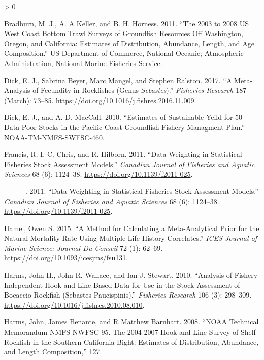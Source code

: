 \documentclass[11pt,
  english,
  a4paper,
]{article}
\newlength{\cslhangindent}
\newenvironment{CSLReferences}[2] %
 {%
  \setlength{\parindent}{0pt}
  \ifodd #1 \everypar{\setlength{\hangindent}{\cslhangindent}}\ignorespaces\fi
  \ifnum #2 > 0
  \setlength{\parskip}{#2\baselineskip}
  \fi
 }%
 {}
\begin{document}
\hypertarget{refs}{}
\begin{CSLReferences}{1}{0}
\leavevmode\hypertarget{ref-bradburn_2003_2011}{}%
Bradburn, M. J., A. A Keller, and B. H. Horness. 2011. {``The 2003 to 2008 {US} {West} {Coast} Bottom Trawl Surveys of Groundfish Resources Off {Washington}, {Oregon}, and {California}: Estimates of Distribution, Abundance, Length, and Age Composition.''} US Department of Commerce, National Oceanic; Atmospheric Administration, National Marine Fisheries Service.

\leavevmode\hypertarget{ref-dick_meta-analysis_2017}{}%
Dick, E. J., Sabrina Beyer, Marc Mangel, and Stephen Ralston. 2017. {``A Meta-Analysis of Fecundity in Rockfishes (Genus \emph{Sebastes}).''} \emph{Fisheries Research} 187 (March): 73--85. \url{https://doi.org/10.1016/j.fishres.2016.11.009}.

\leavevmode\hypertarget{ref-dick_estimates_2010}{}%
Dick, E. J., and A. D. MacCall. 2010. {``Estimates of Sustainable Yeild for 50 Data-Poor Stocks in the {Pacific} {Coast} Groundfish Fishery Managment Plan.''} NOAA-TM-NMFS-SWFSC-460.

\leavevmode\hypertarget{ref-francis_data_2011}{}%
Francis, R. I. C. Chris, and R. Hilborn. 2011. {``Data Weighting in Statistical Fisheries Stock Assessment Models.''} \emph{Canadian Journal of Fisheries and Aquatic Sciences} 68 (6): 1124--38. \url{https://doi.org/10.1139/f2011-025}.

\leavevmode\hypertarget{ref-francis_data_2011}{}%
---------. 2011. {``Data Weighting in Statistical Fisheries Stock Assessment Models.''} \emph{Canadian Journal of Fisheries and Aquatic Sciences} 68 (6): 1124--38. \url{https://doi.org/10.1139/f2011-025}.

\leavevmode\hypertarget{ref-hamel_method_2015}{}%
Hamel, Owen S. 2015. {``A Method for Calculating a Meta-Analytical Prior for the Natural Mortality Rate Using Multiple Life History Correlates.''} \emph{ICES Journal of Marine Science: Journal Du Conseil} 72 (1): 62--69. \url{https://doi.org/10.1093/icesjms/fsu131}.

\leavevmode\hypertarget{ref-harms_analysis_2010}{}%
Harms, John H., John R. Wallace, and Ian J. Stewart. 2010. {``Analysis of Fishery-Independent Hook and Line-Based Data for Use in the Stock Assessment of Bocaccio Rockfish ({Sebastes} Paucispinis).''} \emph{Fisheries Research} 106 (3): 298--309. \url{https://doi.org/10.1016/j.fishres.2010.08.010}.

\leavevmode\hypertarget{ref-harms_noaa_2008}{}%
Harms, John, James Benante, and R Matthew Barnhart. 2008. {``{NOAA} {Technical} {Memorandum} {NMFS}-{NWFSC}-95. {The} 2004-2007 {Hook} and {Line} {Survey} of {Shelf} {Rockfish} in the {Southern} {California} {Bight}: {Estimates} of {Distribution}, {Abundance}, and {Length} {Composition},''} 127.


\end{CSLReferences}
\end{document}

